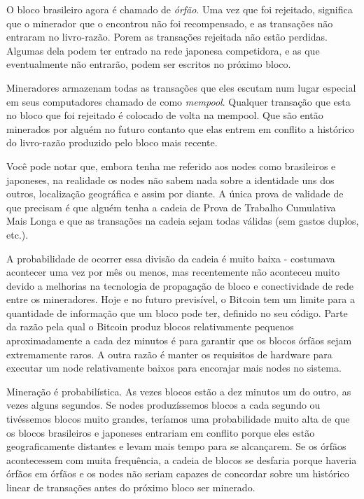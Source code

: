 O bloco brasileiro agora é chamado de \textit{órfão}. Uma vez que foi rejeitado, significa que o minerador que o encontrou não foi recompensado, e as transações não entraram no livro-razão. 
Porem as transações rejeitada não estão perdidas.
Algumas dela podem ter entrado na rede japonesa competidora, e as que eventualmente não entrarão, podem ser escritos no próximo bloco.

Mineradores armazenam todas as transações que eles escutam num lugar especial em seus computadores chamado de como \textit{mempool}. Qualquer transação que esta no bloco que foi rejeitado é colocado de volta na mempool. Que são então minerados por alguém no futuro contanto que elas entrem em conflito a histórico do livro-razão produzido pelo bloco mais recente.

Você pode notar que, embora tenha me referido aos nodes como brasileiros e japoneses, na realidade os nodes não sabem nada sobre a identidade uns dos outros, localização geográfica e assim por diante. A única prova de validade de que precisam é que alguém tenha a cadeia de Prova de Trabalho Cumulativa Mais Longa e que as transações na cadeia sejam todas válidas (sem gastos duplos, etc.).

A probabilidade de ocorrer essa divisão da cadeia é muito baixa - costumava acontecer uma vez por mês ou menos, mas recentemente não aconteceu muito devido a melhorias na tecnologia de propagação de bloco e conectividade de rede entre os mineradores.
Hoje e no futuro previsível, o Bitcoin tem um limite para a quantidade de informação que um bloco pode ter, definido no seu código.
Parte da razão pela qual o Bitcoin produz blocos relativamente pequenos aproximadamente a cada dez minutos é para garantir que os blocos órfãos sejam extremamente raros.
A outra razão é manter os requisitos de hardware para executar um node relativamente baixos para encorajar mais nodes no sistema.

Mineração é probabilística. 
As vezes blocos estão a dez minutos um do outro, as vezes alguns segundos.
Se nodes produzíssemos blocos a cada segundo ou tivéssemos blocos muito grandes, teríamos uma probabilidade muito alta de que os blocos brasileiros e japoneses entrariam em conflito porque eles estão geograficamente distantes e levam mais tempo para se alcançarem. Se os órfãos acontecessem com muita frequência, a cadeia de blocos se desfaria porque haveria órfãos em órfãos e os nodes não seriam capazes de concordar sobre um histórico linear de transações antes do próximo bloco ser minerado.
%

